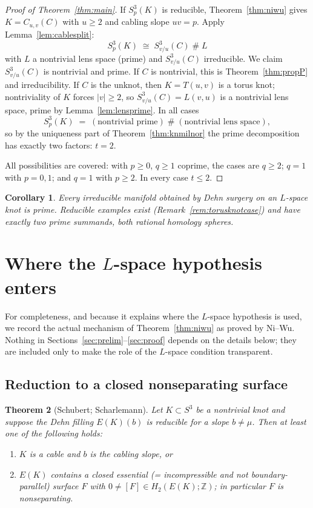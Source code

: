 \documentclass[11pt]{article}
\newtheorem{theorem}{Theorem}[section]
\newtheorem{corollary}[theorem]{Corollary}
\theoremstyle{definition}
\theoremstyle{remark}
\newcommand{\Z}{\mathbb{Z}}
\begin{document}
\begin{proof}[Proof of Theorem~\ref{thm:main}]
If $S^3_p(K)$ is reducible, Theorem~\ref{thm:niwu} gives $K=C_{u,v}(C)$ with
$u\ge 2$ and cabling slope $uv=p$.  Apply Lemma~\ref{lem:cablesplit}:
\[
S^3_p(K)\;\cong\;S^3_{v/u}(C)\;\#\;L
\]
with $L$ a nontrivial lens space (prime) and $S^3_{v/u}(C)$ irreducible.
We claim $S^3_{v/u}(C)$ is nontrivial and prime.  If $C$ is nontrivial, this
is Theorem~\ref{thm:propP} and irreducibility.  If $C$ is the unknot, then
$K=T(u,v)$ is a torus knot; nontriviality of $K$ forces $|v|\ge 2$, so
$S^3_{v/u}(C)=L(v,u)$ is a nontrivial lens space, prime by
Lemma~\ref{lem:lensprime}.  In all cases
\[
S^3_p(K)\;=\;(\text{nontrivial prime})\;\#\;(\text{nontrivial lens space}),
\]
so by the uniqueness part of Theorem~\ref{thm:knmilnor} the prime
decomposition has exactly two factors: $t=2$.

\medskip
All possibilities are covered: with $p\ge 0$, $q\ge1$ coprime, the cases are
$q\ge2$; $q=1$ with $p=0,1$; and $q=1$ with $p\ge2$.  In every case $t\le 2$.
\end{proof}

\begin{corollary}
Every irreducible manifold obtained by Dehn surgery on an $L$-space knot is
prime.  Reducible examples exist (Remark~\ref{rem:torusknotcase}) and have
exactly two prime summands, both rational homology spheres.
\end{corollary}

\section[Where the L-space hypothesis enters]{Where the $L$-space hypothesis enters}\label{sec:mechanism}

For completeness, and because it explains where the $L$-space hypothesis is
used, we record the actual mechanism of Theorem~\ref{thm:niwu} as proved by
Ni--Wu.  Nothing in Sections~\ref{sec:prelim}--\ref{sec:proof} depends on the
details below; they are included only to make the role of the $L$-space
condition transparent.

\subsection{Reduction to a closed nonseparating surface}

\begin{theorem}[Schubert; Scharlemann]\label{thm:scharlemann}
Let $K\subset S^3$ be a nontrivial knot and suppose the Dehn filling
$E(K)(b)$ is reducible for a slope $b\ne\mu$.  Then at least one of the
following holds:
\begin{enumerate}[label=\textup{(\alph*)},leftmargin=2.2em]
 \item $K$ is a cable and $b$ is the cabling slope, or
 \item $E(K)$ contains a closed essential (= incompressible and not
 boundary-parallel) surface $F$ with $0\ne[F]\in H_2(E(K);\Z)$; in particular
 $F$ is nonseparating.
\end{enumerate}
\end{theorem}
\end{document}
